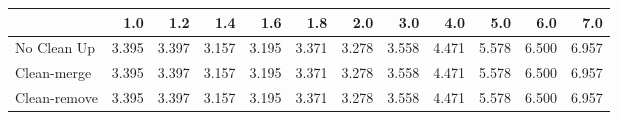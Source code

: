 \begin{tabular}{lrrrrrrrrrrr}
\toprule
{} &   1.0 &   1.2 &   1.4 &   1.6 &   1.8 &   2.0 &   3.0 &   4.0 &   5.0 &   6.0 &   7.0 \\
\midrule
No Clean Up  & 3.395 & 3.397 & 3.157 & 3.195 & 3.371 & 3.278 & 3.558 & 4.471 & 5.578 & 6.500 & 6.957 \\
Clean-merge  & 3.395 & 3.397 & 3.157 & 3.195 & 3.371 & 3.278 & 3.558 & 4.471 & 5.578 & 6.500 & 6.957 \\
Clean-remove & 3.395 & 3.397 & 3.157 & 3.195 & 3.371 & 3.278 & 3.558 & 4.471 & 5.578 & 6.500 & 6.957 \\
\bottomrule
\end{tabular}
